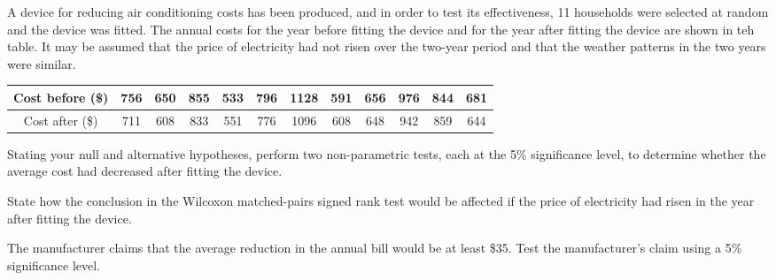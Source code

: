 \begin{problem}
    A device for reducing air conditioning costs has been produced, and in order to test its effectiveness, 11 households were selected at random and the device was fitted. The annual costs for the year before fitting the device and for the year after fitting the device are shown in teh table. It may be assumed that the price of electricity had not risen over the two-year period and that the weather patterns in the two years were similar.

    \begin{table}[H]
        \centering
        \begin{tabular}{|c|c|c|c|c|c|c|c|c|c|c|c|}
        \hline
        Cost before (\$) & 756 & 650 & 855 & 533 & 796 & 1128 & 591 & 656 & 976 & 844 & 681 \\ \hline
        Cost after (\$) & 711 & 608 & 833 & 551 & 776 & 1096 & 608 & 648 & 942 & 859 & 644 \\ \hline
        \end{tabular}
    \end{table}

    Stating your null and alternative hypotheses, perform two non-parametric tests, each at the 5\% significance level, to determine whether the average cost had decreased after fitting the device.

    State how the conclusion in the Wilcoxon matched-pairs signed rank test would be affected if the price of electricity had risen in the year after fitting the device.

    The manufacturer claims that the average reduction in the annual bill would be at least \$35. Test the manufacturer's claim using a 5\% significance level.
\end{problem}
